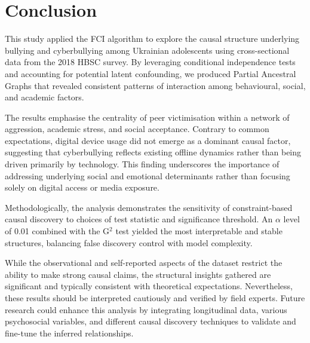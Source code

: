 \documentclass[main.tex]{subfiles}
\begin{document}
\section{Conclusion}

This study applied the FCI algorithm to explore the causal structure underlying bullying and cyberbullying among Ukrainian adolescents using cross-sectional data from the 2018 HBSC survey. By leveraging conditional independence tests and accounting for potential latent confounding, we produced Partial Ancestral Graphs that revealed consistent patterns of interaction among behavioural, social, and academic factors.

The results emphasise the centrality of peer victimisation within a network of aggression, academic stress, and social acceptance. Contrary to common expectations, digital device usage did not emerge as a dominant causal factor, suggesting that cyberbullying reflects existing offline dynamics rather than being driven primarily by technology. This finding underscores the importance of addressing underlying social and emotional determinants rather than focusing solely on digital access or media exposure.

Methodologically, the analysis demonstrates the sensitivity of constraint-based causal discovery to choices of test statistic and significance threshold. An $\alpha$ level of 0.01 combined with the G$^2$ test yielded the most interpretable and stable structures, balancing false discovery control with model complexity.

While the observational and self-reported aspects of the dataset restrict the ability to make strong causal claims, the structural insights gathered are significant and typically consistent with theoretical expectations. Nevertheless, these results should be interpreted cautiously and verified by field experts. Future research could enhance this analysis by integrating longitudinal data, various psychosocial variables, and different causal discovery techniques to validate and fine-tune the inferred relationships.
\end{document}
